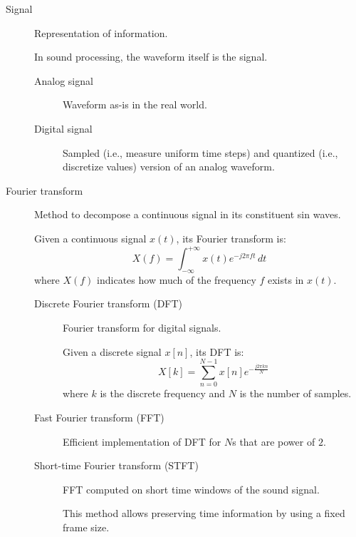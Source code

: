 \begin{description}
    \item[Signal] 
        Representation of information.

        \begin{remark}
            In sound processing, the waveform itself is the signal.
        \end{remark}

        \begin{description}
            \item[Analog signal] 
                Waveform as-is in the real world.

            \item[Digital signal] 
                Sampled (i.e., measure uniform time steps) and quantized (i.e., discretize values) version of an analog waveform.
        \end{description}

    \item[Fourier transform] 
        Method to decompose a continuous signal in its constituent sin waves.

        Given a continuous signal $x(t)$, its Fourier transform is:
        \[ X(f) = \int_{-\infty}^{+\infty} x(t) e^{-j2\pi ft} \,dt \]
        where $X(f)$ indicates how much of the frequency $f$ exists in $x(t)$.

        \begin{description}
            \item[Discrete Fourier transform (DFT)] 
                Fourier transform for digital signals.

                Given a discrete signal $x[n]$, its DFT is:
                \[ X[k] = \sum_{n=0}^{N-1} x[n]e^{-\frac{j2\pi kn}{N}} \]
                where $k$ is the discrete frequency and $N$ is the number of samples.

            \item[Fast Fourier transform (FFT)] 
                Efficient implementation of DFT for $N$s that are power of $2$.

            \item[Short-time Fourier transform (STFT)] 
                FFT computed on short time windows of the sound signal.

                \begin{remark}
                    This method allows preserving time information by using a fixed frame size.
                \end{remark}


\end{description}
\end{description}
